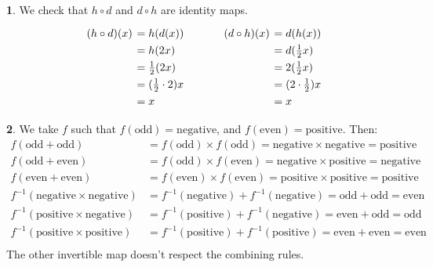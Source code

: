 \documentclass{article}
\theoremstyle{definition}
\theoremstyle{definition}
\theoremstyle{definition}
\newtheorem{solution-internal}{}[subsection]
\newenvironment{solution}{
  \begin{solution-internal}
}{
  \end{solution-internal}
}
\begin{document}
\begin{solution}
We check that $h \circ d$ and $d \circ h$ are identity maps.
\[
\arraycolsep=2pt\renewcommand{\arraystretch}{1.3}
\begin{array}{rl p{1cm} rl}
  (h \circ d)(x) &= h (d (x)) & &    (d \circ h)(x) &= d (h (x)) \\
                 &= h (2 x) & &                   &= d (\frac{1}{2} x) \\
                 &= \frac{1}{2} (2 x) & &         &= 2 (\frac{1}{2} x) \\
                 &= (\frac{1}{2} \cdot 2) x & &   &= (2 \cdot \frac{1}{2}) x\\
                 &= x & &                           &= x
\end{array}
\]
\end{solution}
\begin{solution}
\newcommand{\od}{\mathrm{odd}}
\newcommand{\ev}{\mathrm{even}}
\newcommand{\np}{\mathrm{negative}}
\newcommand{\po}{\mathrm{positive}}

We take $f$ such that $f(\od) = \np$, and $f(\ev) = \po$.
Then:
\begin{align*}
f(\od + \od) & = f(\od) \times f(\od) = \np \times \np = \po \\
f(\od + \ev) & = f(\od) \times f(\ev) = \np \times \po = \np \\
f(\ev + \ev) & = f(\ev) \times f(\ev) = \po \times \po = \po \\
f^{-1}(\np \times \np) & = f^{-1}(\np) + f^{-1}(\np) = \od + \od = \ev \\
f^{-1}(\po \times \np) & = f^{-1}(\po) + f^{-1}(\np) = \ev + \od = \od \\
f^{-1}(\po \times \po) & = f^{-1}(\po) + f^{-1}(\po) = \ev + \ev = \ev \\
\end{align*}
The other invertible map doesn't respect the combining rules.
\end{solution}
\end{document}
